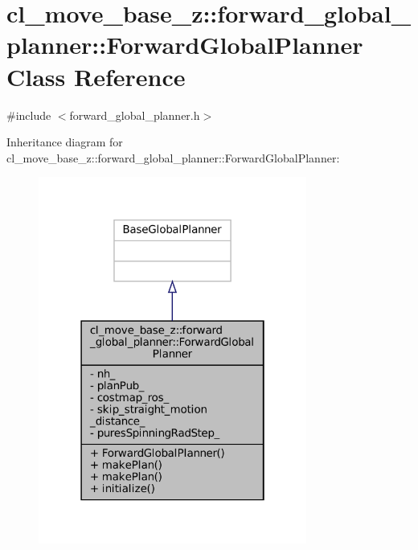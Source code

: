 \hypertarget{classcl__move__base__z_1_1forward__global__planner_1_1ForwardGlobalPlanner}{}\section{cl\+\_\+move\+\_\+base\+\_\+z\+:\+:forward\+\_\+global\+\_\+planner\+:\+:Forward\+Global\+Planner Class Reference}
\label{classcl__move__base__z_1_1forward__global__planner_1_1ForwardGlobalPlanner}


{\ttfamily \#include $<$forward\+\_\+global\+\_\+planner.\+h$>$}



Inheritance diagram for cl\+\_\+move\+\_\+base\+\_\+z\+:\+:forward\+\_\+global\+\_\+planner\+:\+:Forward\+Global\+Planner\+:
\nopagebreak
\begin{figure}[H]
\begin{center}
\leavevmode
\includegraphics[width=250pt]{classcl__move__base__z_1_1forward__global__planner_1_1ForwardGlobalPlanner__inherit__graph}
\end{center}
\end{figure}


